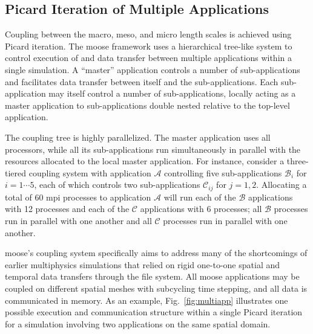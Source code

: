 \subsection{Picard Iteration of Multiple Applications}
\label{sec:multiscale_solution}

Coupling between the macro, meso, and micro length scales is achieved using Picard iteration. The \gls{moose} framework uses a hierarchical tree-like system to control execution of and data transfer between multiple applications within a single simulation. A ``master'' application controls a number of sub-applications and facilitates data transfer between itself and the sub-applications. Each sub-application may itself control a number of sub-applications, locally acting as a master application to sub-applications double nested relative to the top-level application. 

The coupling tree is highly parallelized. The master application uses all processors, while all its sub-applications run simultaneously in parallel with the resources allocated to the local master application. For instance, consider a three-tiered coupling system with application \(\mathcal{A}\) controlling five sub-applications \(\mathcal{B}_i\) for \(i=1\cdots 5\), each of which controls two sub-applications \(\mathcal{C}_{ij}\) for \(j=1, 2\). Allocating a total of 60 \gls{mpi} processes to application \(\mathcal{A}\) will run each of the \(\mathcal{B}\) applications with 12 processes and each of the \(\mathcal{C}\) applications with 6 processes; all \(\mathcal{B}\) processes run in parallel with one another and all \(\mathcal{C}\) processes run in parallel with one another. 

\gls{moose}'s coupling system specifically aims to address many of the shortcomings of earlier multiphysics simulations that relied on rigid one-to-one spatial and temporal data transfers through the file system. All \gls{moose} applications may be coupled on different spatial meshes with subcycling time stepping, and all data is communicated in memory. As an example, Fig.\ \ref{fig:multiapp} illustrates one possible execution and communication structure within a single Picard iteration for a simulation involving two applications on the same spatial domain. 

